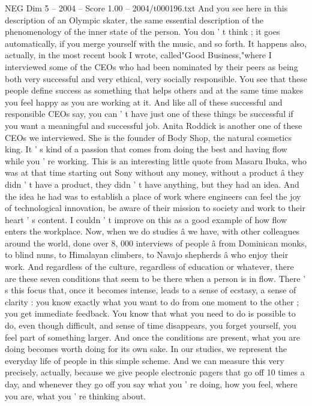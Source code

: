 \begin{textsample}{NEG Dim 5 – 2004 – Score 1.00 – 2004/t000196.txt}
And you see here in this description of an Olympic skater, the same essential description of the phenomenology of the inner state of the person.
You don ' t think ; it goes automatically, if you merge yourself with the music, and so forth.
It happens also, actually, in the most recent book I wrote, called"Good Business,"where I interviewed some of the CEOs who had been nominated by their peers as being both very successful and very ethical, very socially responsible.
You see that these people define success as something that helps others and at the same time makes you feel happy as you are working at it.
And like all of these successful and responsible CEOs say, you can ' t have just one of these things be successful if you want a meaningful and successful job.
Anita Roddick is another one of these CEOs we interviewed.
She is the founder of Body Shop, the natural cosmetics king.
It ' s kind of a passion that comes from doing the best and having flow while you ' re working.
This is an interesting little quote from Masaru Ibuka, who was at that time starting out Sony without any money, without a product â they didn ' t have a product, they didn ' t have anything, but they had an idea.
And the idea he had was to establish a place of work where engineers can feel the joy of technological innovation, be aware of their mission to society and work to their heart ' s content.
I couldn ' t improve on this as a good example of how flow enters the workplace.
Now, when we do studies â we have, with other colleagues around the world, done over 8, 000 interviews of people â from Dominican monks, to blind nuns, to Himalayan climbers, to Navajo shepherds â who enjoy their work.
And regardless of the culture, regardless of education or whatever, there are these seven conditions that seem to be there when a person is in flow.
There ' s this focus that, once it becomes intense, leads to a sense of ecstasy, a sense of clarity : you know exactly what you want to do from one moment to the other ; you get immediate feedback.
You know that what you need to do is possible to do, even though difficult, and sense of time disappears, you forget yourself, you feel part of something larger.
And once the conditions are present, what you are doing becomes worth doing for its own sake.
In our studies, we represent the everyday life of people in this simple scheme.
And we can measure this very precisely, actually, because we give people electronic pagers that go off 10 times a day, and whenever they go off you say what you ' re doing, how you feel, where you are, what you ' re thinking about.

\end{textsample}
